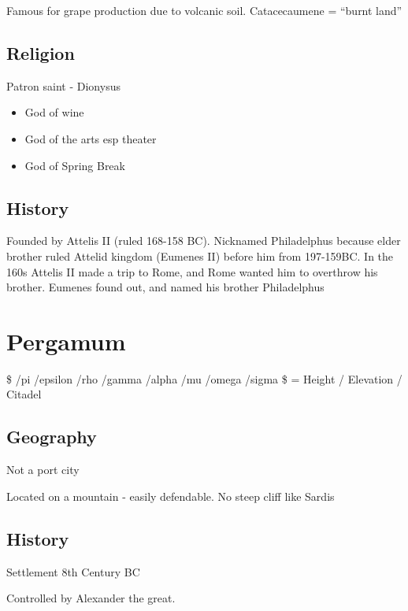 \documentclass[
]{book}
\providecommand{\tightlist}{%
  \setlength{\itemsep}{0pt}\setlength{\parskip}{0pt}}
\begin{document}
Famous for grape production due to volcanic soil. Catacecaumene = ``burnt land''

\hypertarget{religion}{%
\section{Religion}\label{religion}}

Patron saint - Dionysus

\begin{itemize}
\tightlist
\item
  God of wine
\item
  God of the arts esp theater
\item
  God of Spring Break
\end{itemize}

\hypertarget{history-3}{%
\section{History}\label{history-3}}

Founded by Attelis II (ruled 168-158 BC). Nicknamed Philadelphus because elder brother ruled Attelid kingdom (Eumenes II) before him from 197-159BC. In the 160s Attelis II made a trip to Rome, and Rome wanted him to overthrow his brother. Eumenes found out, and named his brother Philadelphus

\hypertarget{pergamum}{%
\chapter{Pergamum}\label{pergamum}}

\$ /pi /epsilon /rho /gamma /alpha /mu /omega /sigma \$ = Height / Elevation / Citadel

\hypertarget{geography-2}{%
\section{Geography}\label{geography-2}}

Not a port city

Located on a mountain - easily defendable. No steep cliff like Sardis

\hypertarget{history-4}{%
\section{History}\label{history-4}}

Settlement 8th Century BC

Controlled by Alexander the great.
\end{document}
